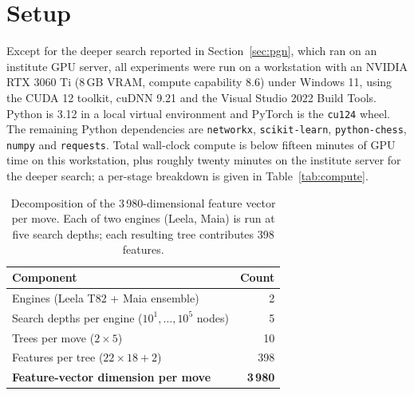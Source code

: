 \documentclass[11pt,a4paper]{article}
\begin{document}
\section{Setup}
\label{sec:setup}

Except for the deeper search reported in Section~\ref{sec:pgn}, which
ran on an institute GPU server, all experiments were run on a
workstation with an NVIDIA RTX 3060 Ti (8\,GB VRAM, compute capability
8.6) under Windows 11, using the CUDA 12 toolkit, cuDNN 9.21 and the
Visual Studio 2022 Build Tools. Python is 3.12 in a local virtual
environment and PyTorch is the \texttt{cu124} wheel. The remaining
Python dependencies are \texttt{networkx}, \texttt{scikit-learn},
\texttt{python-chess}, \texttt{numpy} and \texttt{requests}. Total
wall-clock compute is below fifteen minutes of GPU time on this
workstation, plus roughly twenty minutes on the institute server for
the deeper search; a per-stage breakdown is given in
Table~\ref{tab:compute}.

\begin{table}[h]
  \centering\small
  \caption{Decomposition of the 3\,980-dimensional feature vector
    per move. Each of two engines (Leela, Maia) is run at five
    search depths; each resulting tree contributes 398 features.}
  \label{tab:feat}
  \begin{tabular}{@{}lr@{}}
    \toprule
    \textbf{Component} & \textbf{Count} \\
    \midrule
    Engines (Leela T82 + Maia ensemble)              & 2 \\
    Search depths per engine ($10^1,\dots,10^5$ nodes) & 5 \\
    Trees per move ($2 \times 5$)                     & 10 \\
    Features per tree ($22 \times 18 + 2$)            & 398 \\
    \midrule
    \textbf{Feature-vector dimension per move}        & \textbf{3\,980} \\
    \bottomrule
  \end{tabular}
\end{table}
\end{document}

